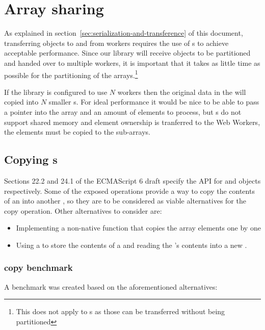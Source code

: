 \section{Array sharing}

As explained in section~\ref{sec:serialization-and-transference} of this document, transferring \ttarray{} objects to and from workers requires the use of s to achieve acceptable performance. Since our library will receive \ttarray{} objects to be partitioned and handed over to multiple workers, it is important that it takes as little time as possible for the partitioning of the arrays.\footnote{This does not apply to \tstarray{}s as those can be transferred without being partitioned}

If the library is configured to use \(N\) workers then the original data in the \ttarray{} will copied into \(N\) smaller \ttarray{}s. For ideal performance it would be nice to be able to pass a pointer into the array and an amount of elements to process, but \ttarray{}s do not support shared memory and element ownership is tranferred to the Web Workers, the elements must be copied to the sub-arrays.

\subsection{Copying \ttarray{}s}
\label{subsec:copying-typed-arrays}
Sections 22.2 and 24.1 of the ECMAScript 6 draft \cite{es6} specify the API for \ttarray{} and \tabuffer{} objects respectively. Some of the exposed operations provide a way to copy the contents of an \tabuffer{} into another \tabuffer{}, so they are to be considered as viable alternatives for the copy operation. Other alternatives to consider are:
\begin{itemize}
  \item Implementing a non-native function that copies the array elements one by one
  \item Using a  to store the contents of a \ttarray{} and reading the 's contents into a new \ttarray{}.
\end{itemize}

\subsubsection{\ttarray{} copy benchmark}
A benchmark was created based on the aforementioned alternatives:

